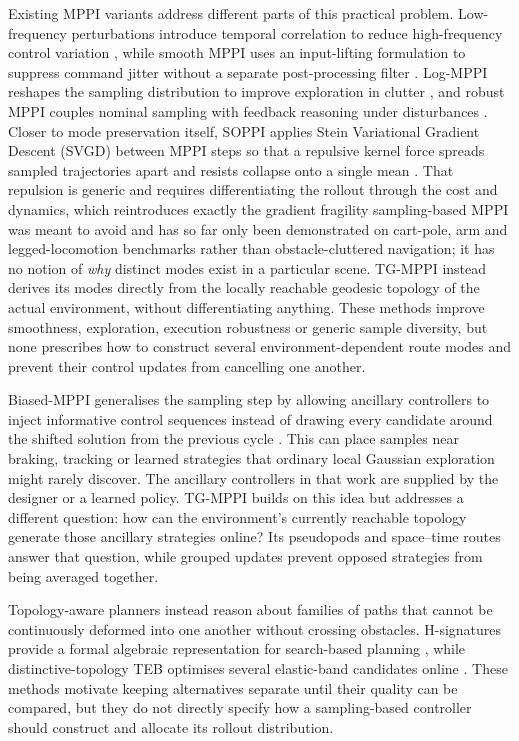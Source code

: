 \documentclass[journal]{IEEEtran}
\begin{document}
Existing MPPI variants address different parts of this practical problem.
Low-frequency perturbations introduce temporal correlation to reduce
high-frequency control variation \cite{vlahov2024lowfrequency}, while smooth
MPPI uses an input-lifting formulation to suppress command jitter without a
separate post-processing filter \cite{kim2022smooth}. Log-MPPI reshapes the
sampling distribution to improve exploration in clutter
\cite{mohamed2022logmppi}, and robust MPPI couples nominal sampling with
feedback reasoning under disturbances \cite{gandhi2021robust}. Closer to mode
preservation itself, SOPPI applies Stein Variational Gradient Descent (SVGD)
between MPPI steps so that a repulsive kernel force spreads sampled
trajectories apart and resists collapse onto a single mean
\cite{aldrich2025soppi}. That repulsion is generic and requires
differentiating the rollout through the cost and dynamics, which reintroduces
exactly the gradient fragility sampling-based MPPI was meant to avoid and has
so far only been demonstrated on cart-pole, arm and legged-locomotion
benchmarks rather than obstacle-cluttered navigation; it has no notion of
\emph{why} distinct modes exist in a particular scene. TG-MPPI instead derives
its modes directly from the locally reachable geodesic topology of the actual
environment, without differentiating anything. These methods
improve smoothness, exploration, execution robustness or generic sample
diversity, but none prescribes how to construct several environment-dependent
route modes and prevent their
control updates from cancelling one another.

Biased-MPPI generalises the sampling step by allowing ancillary controllers to
inject informative control sequences instead of drawing every candidate around
the shifted solution from the previous cycle \cite{trevisan2024biased}. This can
place samples near braking, tracking or learned strategies that ordinary local
Gaussian exploration might rarely discover. The ancillary controllers in that
work are supplied by the designer or a learned policy. TG-MPPI builds on this
idea but addresses a different question: how can the environment's currently
reachable topology generate those ancillary strategies online? Its pseudopods
and space--time routes answer that question, while grouped updates prevent
opposed strategies from being averaged together.

Topology-aware planners instead reason about families of paths that cannot be
continuously deformed into one another without crossing obstacles.
H-signatures provide a formal algebraic representation for search-based
planning \cite{bhattacharya2012hsignature}, while distinctive-topology TEB
optimises several elastic-band candidates online \cite{roesmann2017teb}. These
methods motivate keeping alternatives separate until their quality can be
compared, but they do not directly specify how a sampling-based controller
should construct and allocate its rollout distribution.
\end{document}
